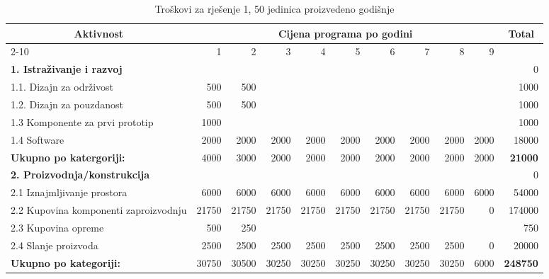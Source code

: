 \documentclass[12pt]{article}
\begin{document}
\begin{landscape}
\begin{table}[htbp]
  \centering
  \small
  \caption{Troškovi za rješenje 1, 50 jedinica proizvedeno godišnje}
    \begin{tabular}{lrrrrrrrrrr}
    \toprule
    \multicolumn{1}{c}{\multirow{2}[4]{*}{Aktivnost}} & \multicolumn{9}{c}{Cijena programa po godini}                         & \multicolumn{1}{c}{\multirow{2}[4]{*}{Total}} \\
\cmidrule{2-10}          & 1     & 2     & 3     & 4     & 5     & 6     & 7     & 8     & 9     &  \\
    \midrule
    \textbf{1. Istraživanje i razvoj} &       &       &       &       &       &       &       &       &       & 0 \\
    1.1. Dizajn za održivost & 500   & 500   &       &       &       &       &       &       &       & 1000 \\
    1.2. Dizajn za pouzdanost & 500   & 500   &       &       &       &       &       &       &       & 1000 \\
    1.3 Komponente za prvi prototip & 1000  &       &       &       &       &       &       &       &       & 1000 \\
    1.4 Software & 2000  & 2000  & 2000  & 2000  & 2000  & 2000  & 2000  & 2000  & 2000  & 18000 \\
    \midrule
    \textbf{Ukupno po katergoriji:} & 4000  & 3000  & 2000  & 2000  & 2000  & 2000  & 2000  & 2000  & 2000  & \textbf{21000} \\
    \midrule
    \textbf{2. Proizvodnja/konstrukcija} &       &       &       &       &       &       &       &       &       & 0 \\
    2.1 Iznajmljivanje prostora & 6000  & 6000  & 6000  & 6000  & 6000  & 6000  & 6000  & 6000  & 6000  & 54000 \\
    \multicolumn{1}{p{14.715em}}{2.2 Kupovina komponenti za\newline{}proizvodnju} & 21750 & 21750 & 21750 & 21750 & 21750 & 21750 & 21750 & 21750 & 0     & 174000 \\
    2.3 Kupovina opreme & 500   & 250   &       &       &       &       &       &       &       & 750 \\
    2.4 Slanje proizvoda & 2500  & 2500  & 2500  & 2500  & 2500  & 2500  & 2500  & 2500  & 0     & 20000 \\
    \midrule
    \textbf{Ukupno po kategoriji:} & 30750 & 30500 & 30250 & 30250 & 30250 & 30250 & 30250 & 30250 & 6000  & \textbf{248750} \\

\end{tabular}
\end{table}
\end{landscape}
\end{document}
